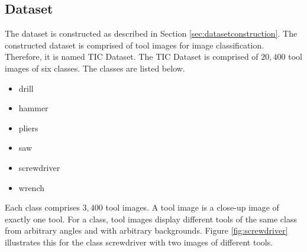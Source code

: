 \subsection{Dataset}
The dataset is constructed as described in Section \ref{sec:datasetconstruction}. The constructed dataset is comprised of tool images for image classification. Therefore, it is named \ac{TIC Dataset}. The \ac{TIC Dataset} is comprised of $20{,}400$ tool images of six classes. The classes are listed below.
\begin{itemize}
	\item drill
	\item hammer
	\item pliers
	\item saw
	\item screwdriver
	\item wrench
\end{itemize}
Each class comprises $3{,}400$ tool images. A tool image is a close-up image of exactly one tool. 
For a class, tool images display different tools of the same class from arbitrary angles and with arbitrary backgrounds. Figure \ref{fig:screwdriver} illustrates this for the class screwdriver with two images of different tools.
